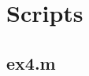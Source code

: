 \section*{Scripts}
\label{sec:scripts}

    \subsection*{ex4.m}
    \label{subsec:ex4}
    
    
    \